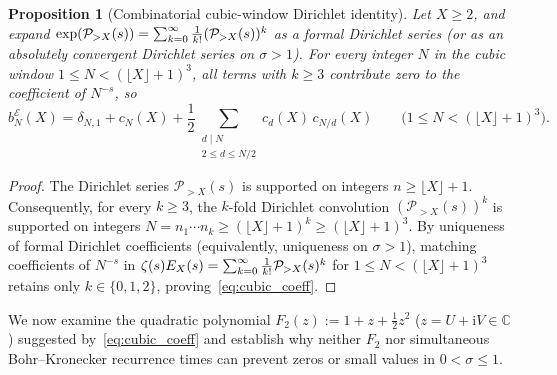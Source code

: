 \documentclass[11pt,reqno]{amsart}
\theoremstyle{plain}
\newtheorem{proposition}[theorem]{Proposition}
\theoremstyle{definition}
\theoremstyle{remark}
\numberwithin{equation}{section}
\newcommand{\ii}{\mathrm{i}}
\newcommand{\fac}{\mathclose{\mathchar"0021}}
\begin{document}
\begin{proposition}[Combinatorial cubic-window Dirichlet identity]\label{prop:cubic_window}
Let $X \ge 2$, and expand $\exp(\mathcal{P}_{>X}(s)) = \sum_{k=0}^{\infty}\frac{1}{k\fac}(\mathcal{P}_{>X}(s))^k$ as a formal Dirichlet series (or as an absolutely convergent Dirichlet series on $\sigma > 1$). For every integer $N$ in the cubic window $1 \le N < (\lfloor X\rfloor + 1)^3$, all terms with $k \ge 3$ contribute zero to the coefficient of $N^{-s}$, so
\begin{equation}\label{eq:cubic_coeff}
b_N^{\mathcal{E}}(X) = \delta_{N,1} + c_N(X) + \frac{1}{2}\sum_{\substack{d \mid N \\ 2 \le d \le N/2}} c_d(X)\,c_{N/d}(X) \qquad \bigl(1 \le N < (\lfloor X\rfloor + 1)^3\bigr).
\end{equation}
\end{proposition}

\begin{proof}
The Dirichlet series $\mathcal{P}_{>X}(s)$ is supported on integers $n \ge \lfloor X\rfloor + 1$. Consequently, for every $k \ge 3$, the $k$-fold Dirichlet convolution $(\mathcal{P}_{>X}(s))^k$ is supported on integers $N = n_1 \cdots n_k \ge (\lfloor X\rfloor + 1)^k \ge (\lfloor X\rfloor + 1)^3$. By uniqueness of formal Dirichlet coefficients (equivalently, uniqueness on $\sigma > 1$), matching coefficients of $N^{-s}$ in $\zeta(s)E_X(s) = \sum_{k=0}^{\infty} \frac{1}{k\fac}\mathcal{P}_{>X}(s)^k$ for $1 \le N < (\lfloor X\rfloor + 1)^3$ retains only $k \in \{0, 1, 2\}$, proving~\eqref{eq:cubic_coeff}.
\end{proof}

We now examine the quadratic polynomial $F_2(z) := 1 + z + \frac{1}{2}z^2$ ($z = U + \ii V \in \mathbb{C}$) suggested by~\eqref{eq:cubic_coeff} and establish why neither $F_2$ nor simultaneous Bohr--Kronecker recurrence times can prevent zeros or small values in $0 < \sigma \le 1$.
\end{document}
